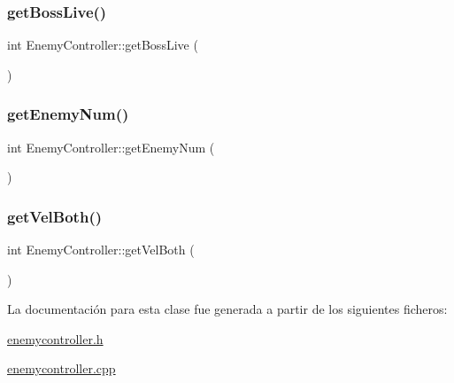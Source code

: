 \subsubsection{\texorpdfstring{get\+Boss\+Live()}{getBossLive()}}
{\footnotesize\ttfamily int Enemy\+Controller\+::get\+Boss\+Live (\begin{DoxyParamCaption}{ }\end{DoxyParamCaption})}

\hypertarget{class_enemy_controller_a8c6a6d2043bbb543a5bf881d662e3e4d}{}\label{class_enemy_controller_a8c6a6d2043bbb543a5bf881d662e3e4d} 
\subsubsection{\texorpdfstring{get\+Enemy\+Num()}{getEnemyNum()}}
{\footnotesize\ttfamily int Enemy\+Controller\+::get\+Enemy\+Num (\begin{DoxyParamCaption}{ }\end{DoxyParamCaption})}

\hypertarget{class_enemy_controller_a9c46c7cc4152f83e2b209ef4bceea150}{}\label{class_enemy_controller_a9c46c7cc4152f83e2b209ef4bceea150} 
\subsubsection{\texorpdfstring{get\+Vel\+Both()}{getVelBoth()}}
{\footnotesize\ttfamily int Enemy\+Controller\+::get\+Vel\+Both (\begin{DoxyParamCaption}{ }\end{DoxyParamCaption})}



La documentación para esta clase fue generada a partir de los siguientes ficheros\+:\begin{DoxyCompactItemize}
\item 
\hyperlink{enemycontroller_8h}{enemycontroller.\+h}\item 
\hyperlink{enemycontroller_8cpp}{enemycontroller.\+cpp}\end{DoxyCompactItemize}
